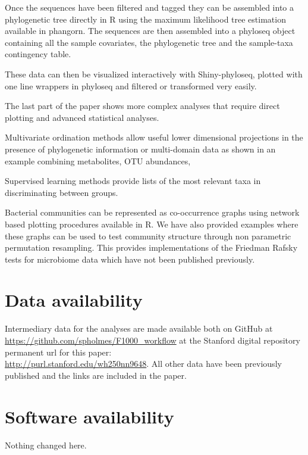 \documentclass[9pt,a4paper]{extarticle}\usepackage[]{graphicx}\usepackage[]{color}
\makeatletter
\newcommand{\pkgname}[1]{\textit{#1}\xspace}
\newcommand{\CRANurl}[1]{\url{http://cran.r-project.org/package=#1}}
\def\CRANpkg{\@ifstar\@CRANpkg\@@CRANpkg}
\def\@CRANpkg#1{\href{http://cran.r-project.org/package=#1}{\pkgname{#1}}}
\def\@@CRANpkg#1{\href{http://cran.r-project.org/package=#1}{\pkgname{#1}}} %
\makeatother
\begin{document}
Once the sequences have been filtered and tagged they can be assembled into a phylogenetic tree directly
in R using the maximum likelihood tree estimation available in \CRANpkg{phangorn}.
The sequences are then assembled into a phyloseq object containing all the sample covariates,
the phylogenetic tree and the sample-taxa contingency table.

These data can then be visualized interactively with Shiny-phyloseq, plotted with one line
wrappers in phyloseq and filtered or transformed very easily.

The last part of the paper shows more complex analyses that require direct plotting and advanced statistical analyses.



Multivariate ordination methods allow useful lower dimensional projections in the presence of phylogenetic
information or multi-domain data as shown in an example combining metabolites, OTU abundances,

Supervised learning methods provide lists of the most relevant taxa in
discriminating between groups.

Bacterial communities can be represented as co-occurrence graphs
using network based plotting procedures available in R. We have also
provided examples where these graphs can be used to test
community structure through non parametric permutation resampling.
This provides implementations of the Friedman Rafsky\cite{friedman1979multivariate} tests for microbiome data
which have not been published previously.







\section*{Data availability} %
Intermediary data for the analyses are made available
both on GitHub at
\url{https://github.com/spholmes/F1000_workflow}
at the Stanford
digital repository permanent url for this paper: \\
\url{http://purl.stanford.edu/wh250nn9648}.
All other data have been previously published and the links are included in
the paper.


\section*{Software availability}
Nothing changed here.
\end{document}
